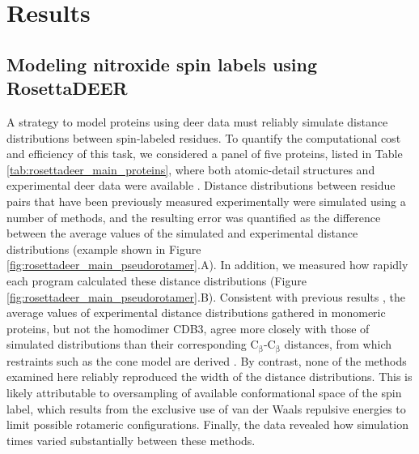 \section{Results}\label{sec:rosettadeer_results}

\subsection{Modeling nitroxide spin labels using RosettaDEER}

A strategy to model proteins using \gls{deer} data must reliably simulate distance distributions between spin-labeled residues. To quantify the computational cost and efficiency of this task, we considered a panel of five proteins, listed in Table \ref{tab:rosettadeer_main_proteins}, where both atomic-detail structures and experimental \gls{deer} data were available \citep*{Altenbach2008, Bleicken2014, Fischer2017, Kazmier2014, Zhou2005}. Distance distributions between residue pairs that have been previously measured experimentally were simulated using a number of methods, and the resulting error was quantified as the difference between the average values of the simulated and experimental distance distributions (example shown in Figure \ref{fig:rosettadeer_main_pseudorotamer}.A). In addition, we measured how rapidly each program calculated these distance distributions (Figure \ref{fig:rosettadeer_main_pseudorotamer}.B). Consistent with previous results \citep*{Fischer2016, Hagelueken2012, Sale2005}, the average values of experimental distance distributions gathered in monomeric proteins, but not the homodimer CDB3, agree more closely with those of simulated distributions than their corresponding $\mathrm{C_{\upbeta}}$-$\mathrm{C_{\upbeta}}$ distances, from which restraints such as the \gls{cone} model are derived \citep*{Alexander2008}. By contrast, none of the methods examined here reliably reproduced the width of the distance distributions. This is likely attributable to oversampling of available conformational space of the spin label, which results from the exclusive use of van der Waals repulsive energies to limit possible rotameric configurations. Finally, the data revealed how simulation times varied substantially between these methods.

